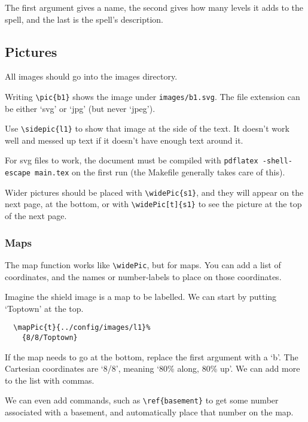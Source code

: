 \documentclass[a4paper,openany]{book}
\begin{document}
\begin{multicols}{2}
The first argument gives a name, the second gives how many levels it adds to the spell, and the last is the spell's description.

\subsection{Pictures}

All images should go into the images directory.

Writing \verb"\pic{b1}" shows the image under \verb"images/b1.svg".
The file extension can be either `svg' or `jpg' (but never `jpeg').

Use \verb"\sidepic{l1}" to show that image at the side of the text.
It doesn't work well and messed up text if it doesn't have enough text around it.


For svg files to work, the document must be compiled with \verb"pdflatex -shell-escape main.tex" on the first run (the Makefile generally takes care of this).

Wider pictures should be placed with \verb"\widePic{s1}", and they will appear on the next page, at the bottom, or with \verb"\widePic[t]{s1}" to see the picture at the top of the next page.


\subsubsection{Maps}

The map function works like \verb"\widePic", but for maps.
You can add a list of coordinates, and the names or number-labels to place on those coordinates.


Imagine the shield image is a map to be labelled.
We can start by putting `Toptown' at the top.

\begin{verbatim}
  \mapPic{t}{../config/images/l1}%
    {8/8/Toptown}
\end{verbatim}

If the map needs to go at the bottom, replace the first argument with a `b'.
The Cartesian coordinates are `8/8', meaning `80\% along, 80\% up'.
We can add more to the list with commas.

We can even add commands, such as \verb"\ref{basement}" to get some number associated with a basement, and automatically place that number on the map.


\end{multicols}
\end{document}
